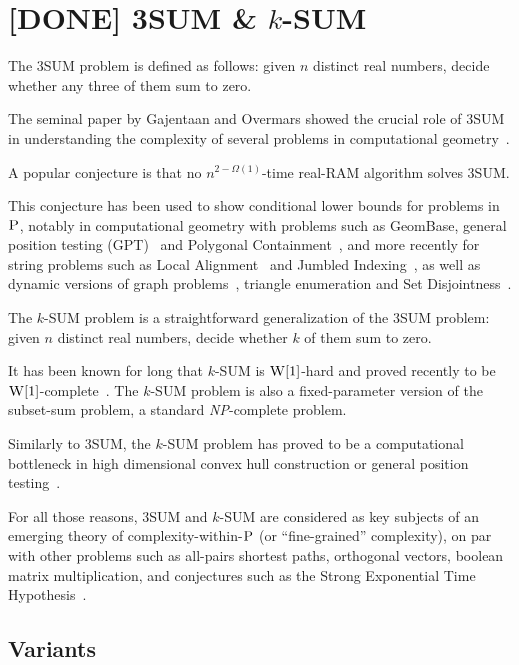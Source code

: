 \section{[DONE] 3SUM \& \(k\)-SUM}\label{sec:problem:sum}

The 3SUM problem is defined as follows: given $n$ distinct real numbers, decide
whether any three of them sum to zero.
%

%
The seminal paper by Gajentaan and Overmars showed the crucial role
of 3SUM in understanding the complexity of several problems in computational
geometry~\cite{GO95}.

A popular conjecture is that no $n^{2-\Omega(1)}$-time real-RAM algorithm
solves 3SUM.
%

%
This conjecture has been used to show conditional
lower bounds for problems in \(\textsc{P}\),
notably in computational geometry with problems
such as
GeomBase, general position testing (GPT)~\cite{GO95}
and
Polygonal Containment~\cite{BH01},
and more recently for string problems such as
Local Alignment~\cite{AVW14}
and
Jumbled Indexing~\cite{ACLL14},
as well as
dynamic versions of graph problems~\cite{Pa10,KPP14,AV14},
triangle enumeration and Set Disjointness~\cite{KPP16}.


The \(k\)-SUM problem is a straightforward generalization of the 3SUM problem:
given \(n\) distinct real numbers, decide whether \(k\) of them sum to zero.
%


It has been known for long that \(k\)-SUM is $\textsc{W}[1]$-hard and proved
recently to be $\textsc{W}[1]$-complete~\cite{ALW14}.
The \(k\)-SUM problem is also a fixed-parameter version of the subset-sum
problem, a standard \textit{NP}-complete problem.

Similarly to 3SUM, the \(k\)-SUM problem
has proved to be a computational bottleneck in high dimensional convex hull
construction or general
position testing~\cite{Er99b}.

For all those reasons, 3SUM and \(k\)-SUM are considered as key subjects of an
emerging theory of complexity-within-\(\textsc{P}\) (or ``fine-grained''
complexity), on par with other problems such as
all-pairs shortest paths,
orthogonal vectors,
boolean matrix multiplication,
and conjectures such as
the Strong Exponential Time Hypothesis~\cite{MO01,PW10,AVY15,HKNS15,CGIMPS16}.



\subsection{Variants}

